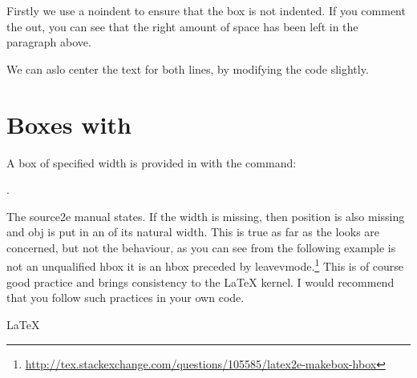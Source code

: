 {%
{}%

Firstly we use a noindent to ensure that the box is not indented. If you comment the out, you can see that the right amount of space has been left in the paragraph above.

\mbox{}
 
\noindent
{}%



\noindent
{}%

We can aslo center the text for both lines, by modifying the code slightly.
\begin{teX}
\noindent
{}%
\end{teX}


\noindent
{}%



\chapter{Boxes with \protect\LaTeXe}

A  box of specified width is provided in \latex with the command:

. 

The source2e manual states. If the width is missing, then position is also missing and obj  is put in an  of its natural width. This is true as far as the looks are concerned, but not the behaviour, as you can see
from the following example is not an unqualified hbox it is an hbox preceded by leavevmode.\footnote{\url{http://tex.stackexchange.com/questions/105585/latex2e-makebox-hbox}} This is of course good practice and brings consistency to the LaTeX kernel. I would recommend that you follow such practices in your own code. 

\begin{texexample}{}{}
\newbox\temp
\savebox{}
LaTeX


\end{texexample}}
